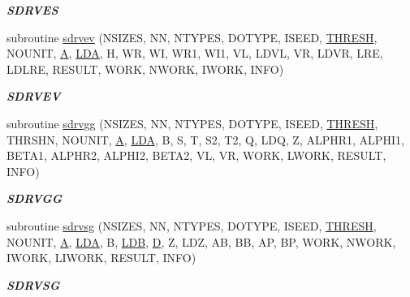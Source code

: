 \begin{DoxyCompactItemize}
\begin{DoxyCompactList}\small\item\em {\bfseries S\+D\+R\+V\+E\+S} \end{DoxyCompactList}\item 
subroutine \hyperlink{group__single__eig_ga375903897d1816ffdc66d54f50f80338}{sdrvev} (N\+S\+I\+Z\+E\+S, N\+N, N\+T\+Y\+P\+E\+S, D\+O\+T\+Y\+P\+E, I\+S\+E\+E\+D, \hyperlink{zlaqgs_8c_a0656018abfc9fa2821827415f5d5ea57}{T\+H\+R\+E\+S\+H}, N\+O\+U\+N\+I\+T, \hyperlink{classA}{A}, \hyperlink{example__user_8c_ae946da542ce0db94dced19b2ecefd1aa}{L\+D\+A}, H, W\+R, W\+I, W\+R1, W\+I1, V\+L, L\+D\+V\+L, V\+R, L\+D\+V\+R, L\+R\+E, L\+D\+L\+R\+E, R\+E\+S\+U\+L\+T, W\+O\+R\+K, N\+W\+O\+R\+K, I\+W\+O\+R\+K, I\+N\+F\+O)
\begin{DoxyCompactList}\small\item\em {\bfseries S\+D\+R\+V\+E\+V} \end{DoxyCompactList}\item 
subroutine \hyperlink{group__single__eig_gac7154f368e4073c5194d3976de3c83e8}{sdrvgg} (N\+S\+I\+Z\+E\+S, N\+N, N\+T\+Y\+P\+E\+S, D\+O\+T\+Y\+P\+E, I\+S\+E\+E\+D, \hyperlink{zlaqgs_8c_a0656018abfc9fa2821827415f5d5ea57}{T\+H\+R\+E\+S\+H}, T\+H\+R\+S\+H\+N, N\+O\+U\+N\+I\+T, \hyperlink{classA}{A}, \hyperlink{example__user_8c_ae946da542ce0db94dced19b2ecefd1aa}{L\+D\+A}, B, S, T, S2, T2, Q, L\+D\+Q, Z, A\+L\+P\+H\+R1, A\+L\+P\+H\+I1, B\+E\+T\+A1, A\+L\+P\+H\+R2, A\+L\+P\+H\+I2, B\+E\+T\+A2, V\+L, V\+R, W\+O\+R\+K, L\+W\+O\+R\+K, R\+E\+S\+U\+L\+T, I\+N\+F\+O)
\begin{DoxyCompactList}\small\item\em {\bfseries S\+D\+R\+V\+G\+G} \end{DoxyCompactList}\item 
subroutine \hyperlink{group__single__eig_ga1d66b6ef4236d0d0cf318e1c64930a38}{sdrvsg} (N\+S\+I\+Z\+E\+S, N\+N, N\+T\+Y\+P\+E\+S, D\+O\+T\+Y\+P\+E, I\+S\+E\+E\+D, \hyperlink{zlaqgs_8c_a0656018abfc9fa2821827415f5d5ea57}{T\+H\+R\+E\+S\+H}, N\+O\+U\+N\+I\+T, \hyperlink{classA}{A}, \hyperlink{example__user_8c_ae946da542ce0db94dced19b2ecefd1aa}{L\+D\+A}, B, \hyperlink{example__user_8c_a50e90a7104df172b5a89a06c47fcca04}{L\+D\+B}, \hyperlink{odrpack_8h_a7dae6ea403d00f3687f24a874e67d139}{D}, Z, L\+D\+Z, A\+B, B\+B, A\+P, B\+P, W\+O\+R\+K, N\+W\+O\+R\+K, I\+W\+O\+R\+K, L\+I\+W\+O\+R\+K, R\+E\+S\+U\+L\+T, I\+N\+F\+O)
\begin{DoxyCompactList}\small\item\em {\bfseries S\+D\+R\+V\+S\+G} \end{DoxyCompactList}\item 

\end{DoxyCompactItemize}
